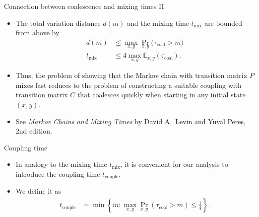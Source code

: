 \documentclass{beamer}
\renewcommand{\>}{\rangle}
\newcommand{\<}{\langle}
\begin{document}

\begin{frame}{Connection between coalescence and mixing times II}

\begin{itemize}
\item The total variation distance $d(m)$ and the mixing time $t_\mathrm{mix}$ are bounded from above by
\begin{align*}
    d(m) 
    &\le 
    \max_{x,y} \Pr_{x,y}\big(\tau_\mathrm{coal} > m \big) \\
    t_\mathrm{mix} 
    &\le 
    4 \max_{x,y} \mathbb{E}_{x,y}(\tau_\mathrm{coal}).
\end{align*}

\medskip
\item Thus, the problem of showing that the Markov chain with transition matrix $P$ mixes fast reduces to the problem of constructing a suitable coupling with transition matrix $C$ that coalesces quickly when starting in any initial state $(x,y)$.

\medskip
\item See \emph{Markov Chains and Mixing Times} by David A.~Levin and Yuval Peres, 2nd edition.

\end{itemize}
\end{frame}


\begin{frame}{Coupling time}

\begin{itemize}
    \item In analogy to the mixing time $t_\mathrm{mix}$, it is convenient for our analysis to introduce the coupling time $t_\mathrm{couple}$.

    \bigskip
    \item We define it as
    \begin{align*}
        t_\mathrm{couple}
        &=
        \min \left\{ 
            m : 
            \max_{x, y} \Pr_{x,y}( \tau_{\mathrm{coal}} > m ) \le \frac{1}{4}
        \right\}.
    \end{align*}
\end{itemize}
\end{frame}

\end{document}
